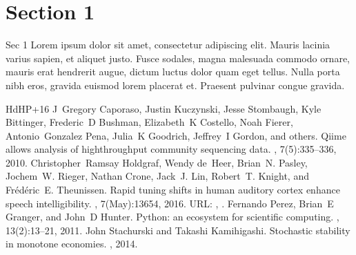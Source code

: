 \documentclass[letterpaper,10pt,english]{jupyterBook}
\begin{document}
\section{Section 1}
\label{\detokenize{part2/sec1:section-1}}\label{\detokenize{part2/sec1::doc}}
Sec 1 Lorem ipsum dolor sit amet, consectetur adipiscing elit. Mauris lacinia varius sapien, et aliquet justo. Fusce sodales, magna malesuada commodo ornare, mauris erat hendrerit augue, dictum luctus dolor quam eget tellus. Nulla porta nibh eros, gravida euismod lorem placerat et. Praesent pulvinar congue gravida.

\begin{sphinxthebibliography}{HdHP+16}
J Gregory Caporaso, Justin Kuczynski, Jesse Stombaugh, Kyle Bittinger, Frederic D Bushman, Elizabeth K Costello, Noah Fierer, Antonio Gonzalez Pena, Julia K Goodrich, Jeffrey I Gordon, and others. Qiime allows analysis of high\sphinxhyphen{}throughput community sequencing data. , 7(5):335–336, 2010.
Christopher Ramsay Holdgraf, Wendy de Heer, Brian N. Pasley, Jochem W. Rieger, Nathan Crone, Jack J. Lin, Robert T. Knight, and Frédéric E. Theunissen. Rapid tuning shifts in human auditory cortex enhance speech intelligibility. , 7(May):13654, 2016. URL: , .
Fernando Perez, Brian E Granger, and John D Hunter. Python: an ecosystem for scientific computing. , 13(2):13–21, 2011.
John Stachurski and Takashi Kamihigashi. Stochastic stability in monotone economies. , 2014.
\end{sphinxthebibliography}







\renewcommand{\indexname}{Index}
\printindex
\end{document}

